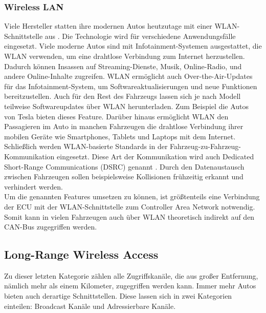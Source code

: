 \subsubsection{Wireless LAN}
Viele Hersteller statten ihre modernen Autos heutzutage mit einer \ac{WLAN}-Schnittstelle aus \cite[4]{Checkoway.2011}. Die Technologie wird für verschiedene Anwendungsfälle eingesetzt. Viele moderne Autos sind mit Infotainment-Systemen ausgestattet, die WLAN verwenden, um eine drahtlose Verbindung zum Internet herzustellen. Dadurch können Insassen auf Streaming-Dienste, Musik, Online-Radio, und andere Online-Inhalte zugreifen. \acs{WLAN} ermöglicht auch Over-the-Air-Updates für das Infotainment-System, um Softwareaktualisierungen und neue Funktionen bereitzustellen. Auch für den Rest des Fahrzeugs lassen sich je nach Modell teilweise Softwareupdates über \acs{WLAN} herunterladen. Zum Beispiel die Autos von Tesla bieten dieses Feature. Darüber hinaus ermöglicht \acs{WLAN} den Passagieren im Auto in manchen Fahrzeugen die drahtlose Verbindung ihrer mobilen Geräte wie Smartphones, Tablets und Laptops mit dem Internet.
Schließlich werden \acs{WLAN}-basierte Standards in der Fahrzeug-zu-Fahrzeug-Kommunikation eingesetzt. Diese Art der Kommunikation wird auch Dedicated Short-Range Communications (DSRC) genannt \cite[4]{Checkoway.2011}. Durch den Datenaustausch zwischen Fahrzeugen sollen beispielsweise Kollisionen frühzeitig erkannt und verhindert werden. \\
Um die genannten Features umsetzen zu können, ist größtenteils eine Verbindung der \acs{ECU} mit der \acs{WLAN}-Schnittstelle zum Controller Area Network notwendig. Somit kann in vielen Fahrzeugen auch über \acs{WLAN} theoretisch indirekt auf den \acs{CAN}-Bus zugegriffen werden.



\subsection{Long-Range Wireless Access}
Zu dieser letzten Kategorie zählen alle Zugriffskanäle, die aus großer Entfernung, nämlich mehr als einem Kilometer, zugegriffen werden kann. Immer mehr Autos bieten auch derartige Schnittstellen. Diese lassen sich in zwei Kategorien einteilen: Broadcast Kanäle und Adressierbare Kanäle. \cite[4]{Checkoway.2011}

